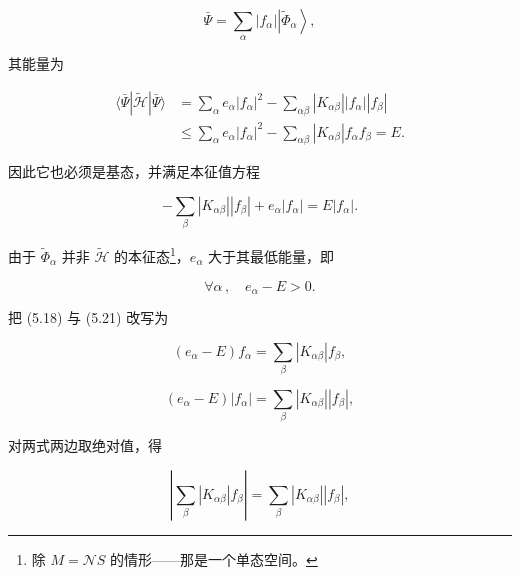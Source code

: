 \begin{equation*}
\bar {\Psi} = \sum_ {\alpha} \left| f _ {\alpha} \right| \left| \tilde {\Phi} _ {\alpha} \right\rangle ,
\tag{5.19}
\end{equation*}

其能量为

\begin{align*}
\langle \bar {\Psi} | \tilde {\mathcal {H}} | \bar {\Psi} \rangle & = \sum_ {\alpha} e _ {\alpha} \left| f _ {\alpha} \right| ^ {2} - \sum_ {\alpha \beta} \left| K _ {\alpha \beta} \right| \left| f _ {\alpha} \right| \left| f _ {\beta} \right|\\
& \leq \sum_ {\alpha} e _ {\alpha} \left| f _ {\alpha} \right| ^ {2} - \sum_ {\alpha \beta} \left| K _ {\alpha \beta} \right| f _ {\alpha} f _ {\beta} = E.
\tag{5.20}
\end{align*}

因此它也必须是基态，并满足本征值方程

\begin{equation*}
- \sum_ {\beta} \left| K _ {\alpha \beta} \right| \left| f _ {\beta} \right| + e _ {\alpha} \left| f _ {\alpha} \right| = E \left| f _ {\alpha} \right| .
\tag{5.21}
\end{equation*}

由于 $\tilde{\Phi}_{\alpha}$ 并非 $\tilde{\mathcal{H}}$ 的本征态\footnote{除 $M = \mathcal{N}S$ 的情形——那是一个单态空间。}，$e_{\alpha}$ 大于其最低能量，即

\begin{equation*}
\forall \alpha \, , \quad e _ {\alpha} - E > 0.
\tag{5.22}
\end{equation*}

把 (5.18) 与 (5.21) 改写为

\begin{equation*}
\left( e _ {\alpha} - E \right) f _ {\alpha} = \sum_ {\beta} \left| K _ {\alpha \beta} \right| f _ {\beta},
\tag{5.23}
\end{equation*}

\begin{equation*}
\left( e _ {\alpha} - E \right) \left| f _ {\alpha} \right| = \sum_ {\beta} \left| K _ {\alpha \beta} \right| \left| f _ {\beta} \right| ,
\tag{5.24}
\end{equation*}

对两式两边取绝对值，得

\begin{equation*}
\left| \sum_ {\beta} \left| K _ {\alpha \beta} \right| f _ {\beta} \right| = \sum_ {\beta} \left| K _ {\alpha \beta} \right| \left| f _ {\beta} \right| ,
\tag{5.25}
\end{equation*}

